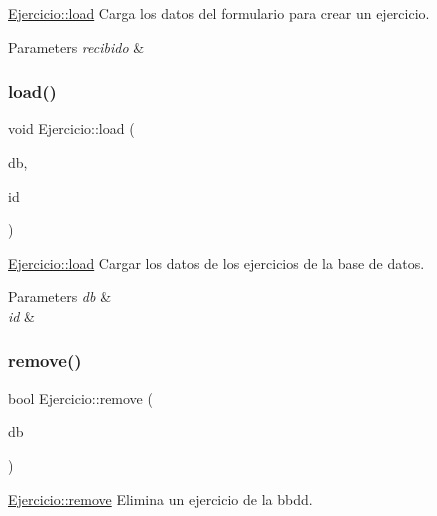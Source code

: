 \mbox{\hyperlink{classEjercicio_a82102164a1561e4990622c709969d94b}{Ejercicio\+::load}} Carga los datos del formulario para crear un ejercicio. 


\begin{DoxyParams}{Parameters}
{\em recibido} & \\
\hline
\end{DoxyParams}
\mbox{\label{classEjercicio_ad0f313e73879f697532a73e6c70529ab}} 
\subsubsection{\texorpdfstring{load()}{load()}\hspace{0.1cm}{\footnotesize\ttfamily [2/2]}}
{\footnotesize\ttfamily void Ejercicio\+::load (\begin{DoxyParamCaption}\item[{Q\+Sql\+Database}]{db,  }\item[{int}]{id }\end{DoxyParamCaption})}



\mbox{\hyperlink{classEjercicio_a82102164a1561e4990622c709969d94b}{Ejercicio\+::load}} Cargar los datos de los ejercicios de la base de datos. 


\begin{DoxyParams}{Parameters}
{\em db} & \\
\hline
{\em id} & \\
\hline
\end{DoxyParams}
\mbox{\label{classEjercicio_a1d7547a6bb4ea39ec2bf6bd95d33b97d}} 
\subsubsection{\texorpdfstring{remove()}{remove()}}
{\footnotesize\ttfamily bool Ejercicio\+::remove (\begin{DoxyParamCaption}\item[{Q\+Sql\+Database}]{db }\end{DoxyParamCaption})}



\mbox{\hyperlink{classEjercicio_a1d7547a6bb4ea39ec2bf6bd95d33b97d}{Ejercicio\+::remove}} Elimina un ejercicio de la bbdd. 


